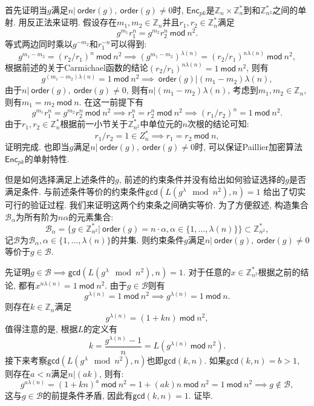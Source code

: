 \documentclass{article}
\newcommand{\Z}{\mathbb{Z}}
\begin{document}
首先证明当$g$满足$n | ~\textsf{order}(g), ~\textsf{order}(g) \neq 0$时, 
$\textsf{Enc}_{pk}$是$\Z_n\times\Z_n^*$到和$\Z_{n^2}^*$之间的单射.
用反正法来证明. 假设存在$m_1, m_2 \in\Z_n$并且$r_1, r_2\in \Z_n^*$满足
$$
g^{m_1}r_1^n = g^{m_2}r_2^n ~\textsf{mod}~n^2.
$$
等式两边同时乘以$g^{-m_2}$和$r_1^{-n}$可以得到:
$$
g^{m_1 - m_2} = (r_2 / r_1)^n ~\textsf{mod}~n^2 \implies 
\left(g^{m_1 - m_2}\right)^{\lambda(n)} = (r_2 / r_1)^{n\lambda(n)} ~\textsf{mod}~n^2,
$$
根据前述的关于Carmichael函数的结论$(r_2 / r_1)^{n\lambda(n)} = 1 ~\textsf{mod}~n^2$, 则有
$$
g^{(m_1 - m_2)\lambda(n)} = 1 ~\textsf{mod}~n^2 \implies ~\textsf{order}(g) | (m_1-m_2)\lambda(n),
$$
由于$n | ~\textsf{order}(g), ~\textsf{order}(g) \neq 0$, 则有$n | (m_1-m_2)\lambda(n)$, 
考虑到$m_1, m_2 \in\Z_n$, 则有$m_1 = m_2 ~\textsf{mod}~n$. 在这一前提下有
$$
g^{m_1}r_1^n = g^{m_2}r_2^n ~\textsf{mod}~n^2 \implies 
r_1^n = r_2^n ~\textsf{mod}~n^2 \implies (r_1 / r_2)^n = 1 ~\textsf{mod}~n^2.
$$
由于$r_1, r_2\in \Z_n^*$根据前一小节关于$\Z_{n^2}^*$中单位元的$n$次根的结论可知:
$$
r_1 / r_2 = 1 \in Z_n^* \implies r_1 = r_2 ~\textsf{mod}~ n,
$$
证明完成. 也即当$g$满足$n | ~\textsf{order}(g), ~\textsf{order}(g) \neq 0$时, 
可以保证Paillier加密算法$\textsf{Enc}_{pk}$的单射特性.

但是如何选择满足上述条件的$g$, 前述的约束条件并没有给出如何验证选择的$g$是否满足条件.
与前述条件等价的约束条件$\textsf{gcd}\left(L\left(g^\lambda \mod n^2\right), n\right) = 1$
给出了切实可行的验证过程. 我们来证明这两个约束条之间确实等价. 为了方便叙述, 构造集合
$\mathcal{B}_{\alpha}$为所有阶为$n\alpha$的元素集合: 
$$
\mathcal{B}_{\alpha} = \{g \in \Z_{n^2}^* | ~\textsf{order}(g) = 
n\cdot \alpha, \alpha \in \{1, \ldots, \lambda(n)\} \} \subset \Z_{n^2}^*,
$$
记$\mathcal{B}$为$\mathcal{B}_{\alpha}, \alpha \in \{1, \ldots, \lambda(n)\}$的并集.
则约束条件$g$满足$n | ~\textsf{order}(g), ~\textsf{order}(g) \neq 0$
等价于$g \in \mathcal{B}$.

先证明$g\in \mathcal{B} \implies \textsf{gcd}\left(L\left(g^\lambda \mod n^2\right), n\right) = 1$.
对于任意的$x\in\Z_{n^2}^*$根据之前的结论, 都有$x^{n\lambda(n)} = 1~\textsf{mod}~n^2$.
由于$g\in\mathcal{B}$则有
$$
g^{\lambda(n)} =  1~\textsf{mod}~n^2 \implies g^{\lambda(n)} =  1~\textsf{mod}~n.
$$
则存在$k\in\Z_n$满足
$$g^{\lambda(n)} = (1 + kn)~\textsf{mod}~n^2, $$
值得注意的是,  根据$L$的定义有
$$
k = \frac{g^{\lambda(n)} - 1}{n} = L\left(g^{\lambda(n)}~\textsf{mod}~n^2\right).
$$
接下来考察$\textsf{gcd}\left(L\left(g^\lambda \mod n^2\right), n\right)$也即$\textsf{gcd}(k, n)$.
如果$\textsf{gcd}(k, n)= b > 1$, 则存在$a < n$满足$n | (ak)$, 则有:
$$
g^{a\lambda(n)} = (1 + kn)^a~\textsf{mod}~n^2 = 1 + (ak)n ~\textsf{mod}~n^2 
= 1~\textsf{mod}~n^2 \implies g \notin \mathcal{B}, 
$$
这与$g \in \mathcal{B}$的前提条件矛盾, 因此有$\textsf{gcd}(k, n)= 1$. 证毕.
\end{document}
